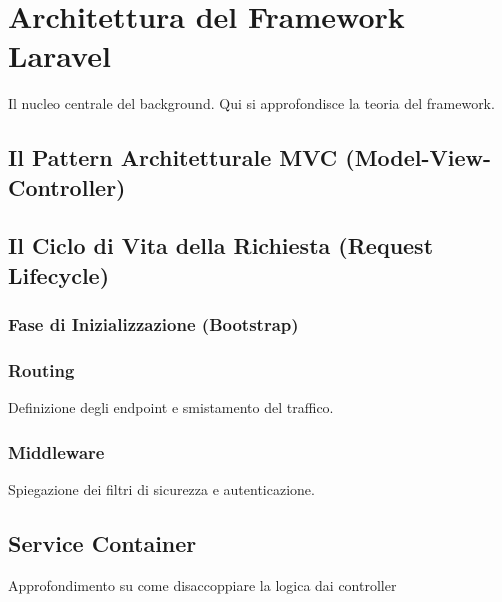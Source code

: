 \section{Architettura del Framework Laravel}
Il nucleo centrale del background. Qui si approfondisce la teoria del framework.

\subsection{Il Pattern Architetturale MVC (Model-View-Controller)}


\subsection{Il Ciclo di Vita della Richiesta (Request Lifecycle)}

\subsubsection{Fase di Inizializzazione (Bootstrap)}

\subsubsection{Routing} 
Definizione degli endpoint e smistamento del traffico.

\subsubsection{Middleware} 
Spiegazione dei filtri di sicurezza e autenticazione.

\subsection{Service Container} 
Approfondimento su come disaccoppiare la logica dai controller 

